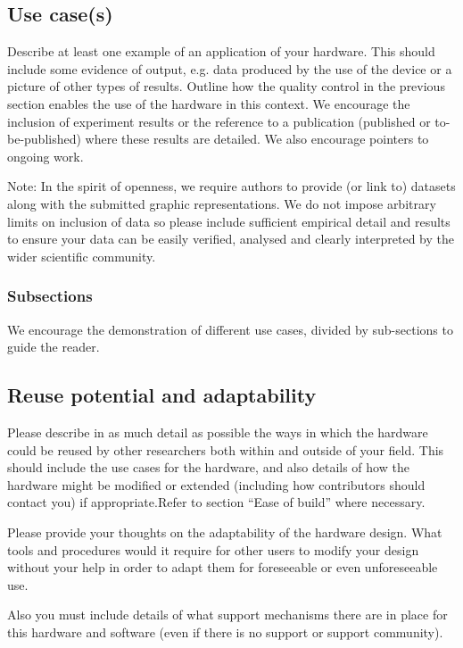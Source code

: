 \documentclass[a4paper]{article}
\begin{document}
\subsection{Use case(s)}\label{h.4q5g9edishy3}

Describe at least one example of an application of your hardware. This
should include some evidence of output, e.g. data produced by the use of
the device or a picture of other types of results. Outline how the
quality control in the previous section enables the use of the hardware
in this context. We encourage the inclusion of experiment results or the
reference to a publication (published or to-be-published) where these
results are detailed. We also encourage pointers to ongoing work.

Note: In the spirit of openness, we require authors to provide (or link
to) datasets along with the submitted graphic representations. We do not
impose arbitrary limits on inclusion of data so please include
sufficient empirical detail and results to ensure your data can be
easily verified, analysed and clearly interpreted by the wider
scientific community.


\subsubsection{Subsections}\label{h.qz4dez1pbkv1}

We encourage the demonstration of different use cases, divided by
sub-sections to guide the reader.


\subsection{Reuse potential and adaptability}\label{h.6wkumyl0ejrh}

Please describe in as much detail as possible the ways in which the
hardware could be reused by other researchers both within and outside of
your field. This should include the use cases for the hardware, and also
details of how the hardware might be modified or extended (including how
contributors should contact you) if appropriate.Refer to section
``Ease of build'' where necessary.

Please provide your thoughts on the adaptability of the hardware
design. What tools and procedures would it require for other users to
modify your design without your help in order to adapt them for
foreseeable or even unforeseeable use.

Also you must include details of what support mechanisms there are in
place for this hardware and software (even if there is no support or
support community).
\end{document}
